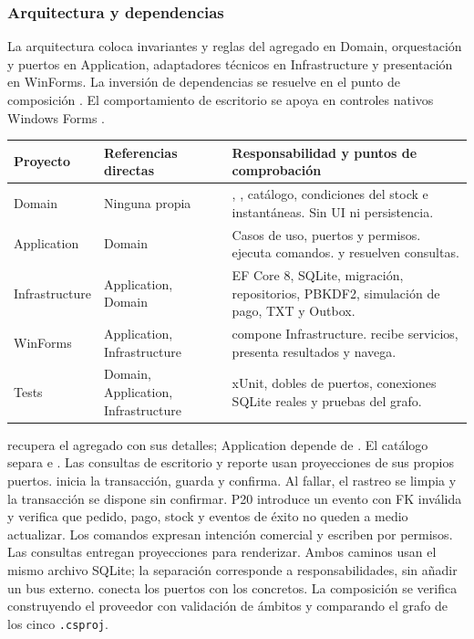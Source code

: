 \subsubsection{Arquitectura y dependencias}
La arquitectura coloca invariantes y reglas del agregado en Domain, orquestación y puertos en Application, adaptadores técnicos en Infrastructure y presentación en WinForms. La inversión de dependencias se resuelve en el punto de composición \cite{cleanarch}. El comportamiento de escritorio se apoya en controles nativos Windows Forms \cite{winforms}.

\begin{longtable}{@{}L{.21\linewidth}L{.25\linewidth}L{.47\linewidth}@{}}
\toprule Proyecto & Referencias directas & Responsabilidad y puntos de comprobación \\ \midrule\endhead
Domain & Ninguna propia & , , catálogo, condiciones del stock e instantáneas. Sin UI ni persistencia. \\
Application & Domain & Casos de uso, puertos y permisos.  ejecuta comandos.  y  resuelven consultas. \\
Infrastructure & Application, Domain & EF Core 8, SQLite, migración, repositorios, PBKDF2, simulación de pago, TXT y Outbox. \\
WinForms & Application, Infrastructure &  compone Infrastructure.  recibe servicios, presenta resultados y navega. \\
Tests & Domain, Application, Infrastructure & xUnit, dobles de puertos, conexiones SQLite reales y pruebas del grafo. \\
\bottomrule
\end{longtable}

  recupera el agregado con sus detalles; Application depende de . El catálogo separa  e . Las consultas de escritorio y reporte usan proyecciones de sus propios puertos.
  inicia la transacción, guarda y confirma. Al fallar, el rastreo se limpia y la transacción se dispone sin confirmar. P20 introduce un evento con FK inválida y verifica que pedido, pago, stock y eventos de éxito no queden a medio actualizar.
 Los comandos expresan intención comercial y escriben por permisos. Las consultas entregan proyecciones para renderizar. Ambos caminos usan el mismo archivo SQLite; la separación corresponde a responsabilidades, sin añadir un bus externo.
  conecta los puertos con los concretos. La composición se verifica construyendo el proveedor con validación de ámbitos y comparando el grafo de los cinco \texttt{.csproj}.

